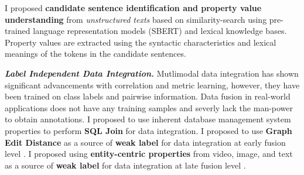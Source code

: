 \documentclass[9pt]{article}
\newcommand*\heading[1]{\large\textbf{\textit{#1.}}}
\begin{document}
%
%
I proposed \textbf{candidate sentence identification and property value understanding} \cite{solaiman2022femmir} from \textit{unstructured texts} based on similarity-search using pre-trained language representation models (SBERT) and lexical knowledge bases. Property values are extracted using the syntactic characteristics and lexical meanings of the tokens in the candidate sentences.


\heading{Label Independent Data Integration}
Mutlimodal data integration has shown significant advancements with correlation and metric learning, however, they have been trained on class labels and pairwise information. Data fusion in real-world applications does not have any training samples and severly lack the man-power to obtain annotations. 
I proposed to use inherent database management system properties to perform \textbf{SQL Join} \cite{solaiman2021applying} for data integration. %
I proposed to use \textbf{Graph Edit Distance} as a source of \textbf{weak label} for data integration at early fusion level \cite{solaiman2022femmir}. %
I proposed using \textbf{entity-centric properties} from video, image, and text as a source of \textbf{weak label} for data integration at late fusion level \cite{solaiman2022open}. %

\end{document}
